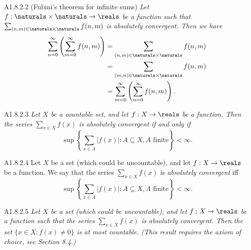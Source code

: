 \begin{theorem}{A1.8.2.2}
    (Fubini's theorem for infinite sums) \emph{Let $f: \naturals \times \naturals \to \reals$
    be a function such that $\sum_{(n, m) \in \naturals \times \naturals} f(n, m)$ is
    absolutely convergent. Then we have
    \begin{align*}
        \sum_{n=0}^{\infty} \left( \sum_{m=0}^{\infty} f(n, m) \right)
        &= \sum_{(n, m) \in \naturals \times \naturals} f(n, m) \\
        &= \sum_{(m, n) \in \naturals \times \naturals} f(n, m) \\
        &= \sum_{m=0}^{\infty} \left( \sum_{n=0}^{\infty} f(n, m) \right).
    \end{align*}}
\end{theorem}

\begin{lemma}{A1.8.2.3}
    \emph{Let $X$ be a countable set, and let $f: X \to \reals$ be a function.
    Then the series $\sum_{x \in X} f(x)$ is absolutely convergent if and only if
    \begin{equation*}
        \sup \left\{ \sum_{x \in A} |f(x)| : A \subseteq X, A \text{ finite} \right\} < \infty.
    \end{equation*}}
\end{lemma}

\begin{definition}{A1.8.2.4}
    Let $X$ be a set (which could be uncountable), and let $f: X \to \reals$ be a
    function. We say that the series $\sum_{x \in X} f(x)$ is \emph{absolutely convergent}
    iff
    \begin{equation*}
        \sup \left\{ \sum_{x \in A} |f(x)| : A \subseteq X, A \text{ finite} \right\} < \infty.
    \end{equation*}
\end{definition}

\begin{lemma}{A1.8.2.5}
    \emph{Let $X$ be a set (which could be uncountable), and let $f: X \to \reals$
    be a function such that the series $\sum_{x \in X} f(x)$ is absolutely convergent.
    Then the set $\{x \in X : f(x) \neq 0\}$ is at most countable. (This result
    requires the axiom of choice, see Section 8.4.)}
\end{lemma}

